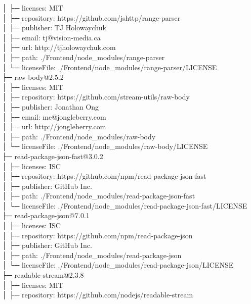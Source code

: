 \documentclass[
    paper=a4,
    twoside=false,
    parskip=half,
    listof=entryprefix,
    listof=totoc,
    index=totoc,
    bibliography=totoc,
    headsepline,
]{scrbook}
\begin{document}
    │  ├─ licenses: MIT\\
    │  ├─ repository: https://github.com/jshttp/range-parser\\
    │  ├─ publisher: TJ Holowaychuk\\
    │  ├─ email: tj@vision-media.ca\\
    │  ├─ url: http://tjholowaychuk.com\\
    │  ├─ path: ./Frontend/node\_modules/range-parser\\
    │  └─ licenseFile: ./Frontend/node\_modules/range-parser/LICENSE\\
    ├─ raw-body@2.5.2\\
    │  ├─ licenses: MIT\\
    │  ├─ repository: https://github.com/stream-utils/raw-body\\
    │  ├─ publisher: Jonathan Ong\\
    │  ├─ email: me@jongleberry.com\\
    │  ├─ url: http://jongleberry.com\\
    │  ├─ path: ./Frontend/node\_modules/raw-body\\
    │  └─ licenseFile: ./Frontend/node\_modules/raw-body/LICENSE\\
    ├─ read-package-json-fast@3.0.2\\
    │  ├─ licenses: ISC\\
    │  ├─ repository: https://github.com/npm/read-package-json-fast\\
    │  ├─ publisher: GitHub Inc.\\
    │  ├─ path: ./Frontend/node\_modules/read-package-json-fast\\
    │  └─ licenseFile: ./Frontend/node\_modules/read-package-json-fast/LICENSE\\
    ├─ read-package-json@7.0.1\\
    │  ├─ licenses: ISC\\
    │  ├─ repository: https://github.com/npm/read-package-json\\
    │  ├─ publisher: GitHub Inc.\\
    │  ├─ path: ./Frontend/node\_modules/read-package-json\\
    │  └─ licenseFile: ./Frontend/node\_modules/read-package-json/LICENSE\\
    ├─ readable-stream@2.3.8\\
    │  ├─ licenses: MIT\\
    │  ├─ repository: https://github.com/nodejs/readable-stream\\
\end{document}
